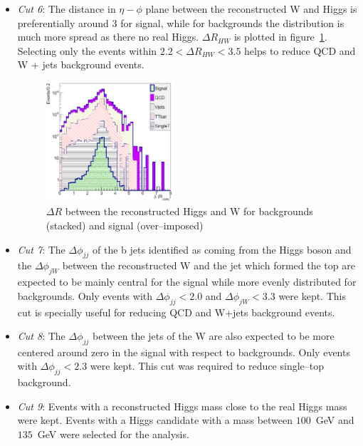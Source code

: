\begin{itemize}
\item \textit{Cut 6}: The distance in $\eta-\phi$ plane between the reconstructed W and Higgs is preferentially around 3 for signal, while for backgrounds the distribution is much more spread as there no real Higgs. $\Delta R_{HW}$ is plotted in figure~\ref{fig:Var3}. Selecting only the events within $2.2<\Delta R_{HW}<3.5$ helps to reduce QCD and W + jets background events.

\begin{figure}[!Hhtbp]
  \begin{center}
    \includegraphics[width=0.45\textwidth]{figs/Pheno/DRWH.png}
    \caption{$\Delta R$ between the reconstructed Higgs and W for backgrounds (stacked) and signal (over--imposed)}
    \label{fig:Var3}
  \end{center}
\end{figure}

\item \textit{Cut 7}: The $\Delta \phi_{jj}$ of the b jets identified as coming from the Higgs boson and the $\Delta \phi_{jW}$ between the reconstructed W and the jet which formed the top are expected to be mainly central for the signal while more evenly distributed for backgrounds. Only events with $\Delta \phi_{jj}<2.0$ and $\Delta \phi_{jW}<3.3$ were kept. This cut is specially useful for reducing QCD and W+jets background events.

\item \textit{Cut 8}: The $\Delta \phi_{jj}$ between the jets of the W are also expected to be more centered around zero in the signal with respect to backgrounds. Only events with $\Delta \phi_{jj}<2.3$ were kept. This cut was required to reduce single--top background.

\item \textit{Cut 9}: Events with a reconstructed Higgs mass close to the real Higgs mass were kept. Events with a Higgs candidate with a mass between $100$~GeV and $135$~GeV were selected for the analysis.


\end{itemize}
